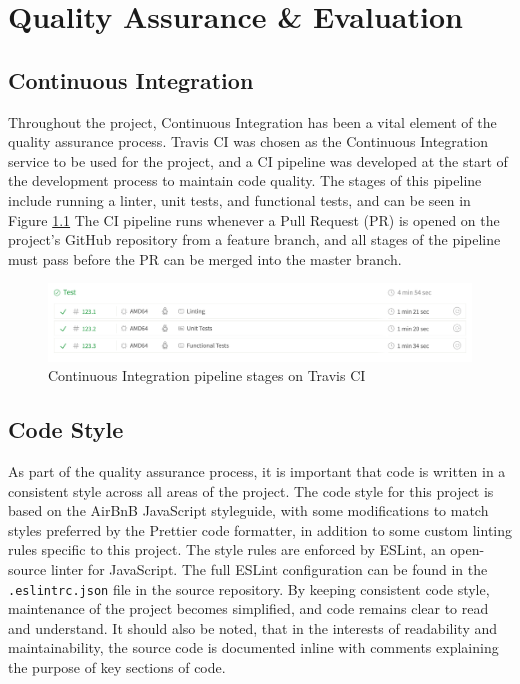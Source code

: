 \chapter{Quality Assurance \& Evaluation}


\section{Continuous Integration}
Throughout the project, Continuous Integration has been a vital element of the quality assurance process. Travis CI was chosen as the Continuous Integration service to be used for the project, and a CI pipeline was developed at the start of the development process to maintain code quality. The stages of this pipeline include running a linter, unit tests, and functional tests, and can be seen in Figure \ref{fig:ci-pipeline} The CI pipeline runs whenever a Pull Request (PR) is opened on the project's GitHub repository from a feature branch, and all stages of the pipeline must pass before the PR can be merged into the master branch.

\begin{figure}[h!]
  \centering
  \includegraphics[width=\textwidth]{images/ci-pipeline.png}
  \caption{Continuous Integration pipeline stages on Travis CI}
  \label{fig:ci-pipeline}
\end{figure}

\section{Code Style}
As part of the quality assurance process, it is important that code is written in a consistent style across all areas of the project. The code style for this project is based on the AirBnB JavaScript styleguide, with some modifications to match styles preferred by the Prettier code formatter, in addition to some custom linting rules specific to this project. The style rules are enforced by ESLint, an open-source linter for JavaScript. The full ESLint configuration can be found in the \verb|.eslintrc.json| file in the source repository. By keeping consistent code style, maintenance of the project becomes simplified, and code remains clear to read and understand. It should also be noted, that in the interests of readability and maintainability, the source code is documented inline with comments explaining the purpose of key sections of code.

